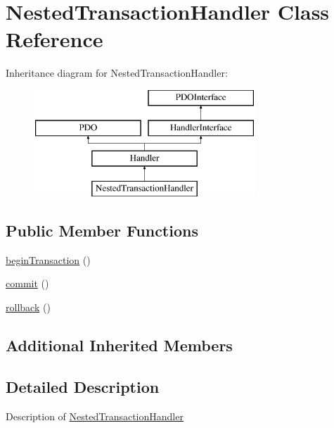 \hypertarget{class_pes_1_1_database_1_1_handler_1_1_nested_transaction_handler}{}\section{Nested\+Transaction\+Handler Class Reference}
\label{class_pes_1_1_database_1_1_handler_1_1_nested_transaction_handler}
Inheritance diagram for Nested\+Transaction\+Handler\+:\begin{figure}[H]
\begin{center}
\leavevmode
\includegraphics[height=4.000000cm]{class_pes_1_1_database_1_1_handler_1_1_nested_transaction_handler}
\end{center}
\end{figure}
\subsection*{Public Member Functions}
\begin{DoxyCompactItemize}
\item 
\mbox{\hyperlink{class_pes_1_1_database_1_1_handler_1_1_nested_transaction_handler_af3380f3b13931d581fa973a382946b32}{begin\+Transaction}} ()
\item 
\mbox{\hyperlink{class_pes_1_1_database_1_1_handler_1_1_nested_transaction_handler_af5674c27d4a92f6228565010eacbb9cb}{commit}} ()
\item 
\mbox{\hyperlink{class_pes_1_1_database_1_1_handler_1_1_nested_transaction_handler_afa549adf79e3f8c09fe8f903dd5fbfa7}{rollback}} ()
\end{DoxyCompactItemize}
\subsection*{Additional Inherited Members}


\subsection{Detailed Description}
Description of \mbox{\hyperlink{class_pes_1_1_database_1_1_handler_1_1_nested_transaction_handler}{Nested\+Transaction\+Handler}}

